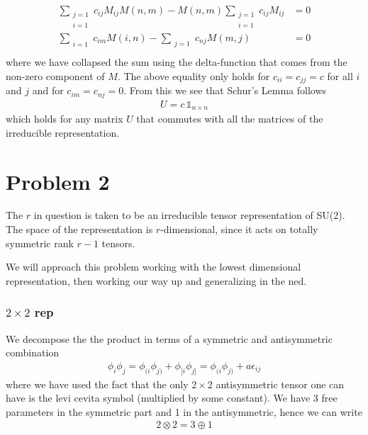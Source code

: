 \documentclass[a4paper,12pt]{article}
\begin{document}
\begin{equation}
	\begin{aligned}
		\sum_{\substack{j=1\\i=1}}c_{ij}M_{ij}M(n,m)-M(n,m)\sum_{\substack{j=1\\i=1}}c_{ij}M_{ij}&=0\\
		\sum_{\substack{i=1}}c_{im}M(i,n)-\sum_{\substack{j=1}} c_{nj}M(m,j)&=0\\
	\end{aligned}
\end{equation}
where we have collapsed the sum using the delta-function that comes from the non-zero component of $M$. The above equality only holds for $c_{ii}=c_{jj}=c$ for all $i$ and $j$ and for $c_{im}=c_{nj}=0$. From this we see that Schur's Lemma follows
\begin{equation}
	\begin{aligned}
		U=c \, \mathds{1}_{n\times n}
	\end{aligned}
\end{equation}
which holds for any matrix $U$ that commutes with all the matrices of the irreducible representation.
\section*{Problem 2}
The $r$ in question is taken to be an irreducible tensor representation of SU(2). The space of the representation is $r$-dimensional, since it acts on totally symmetric rank $r-1$ tensors.

 We will approach this problem working with the lowest dimensional representation, then working our way up and generalizing in the ned.
\subsubsection*{$2\times 2 $ rep}
We decompose the the product in terms of a symmetric and antisymmetric combination
\begin{equation}
	\begin{aligned}
		\phi_i\phi_j=\phi_{(i}\phi_{j)}+\phi_{[i}\phi_{j]}=\phi_{(i}\phi_{j)}+a\epsilon_{ij}
	\end{aligned}
\end{equation}
where we have used the fact that the only $2\times 2$ antisymmetric tensor one can have is the levi cevita symbol (multiplied by some constant). We have 3 free parameters in the symmetric part and 1 in the antisymmetric, hence we can write
\begin{equation}
	\begin{aligned}
		2\otimes 2 = 3\oplus 1
	\end{aligned}
\end{equation}
\end{document}

